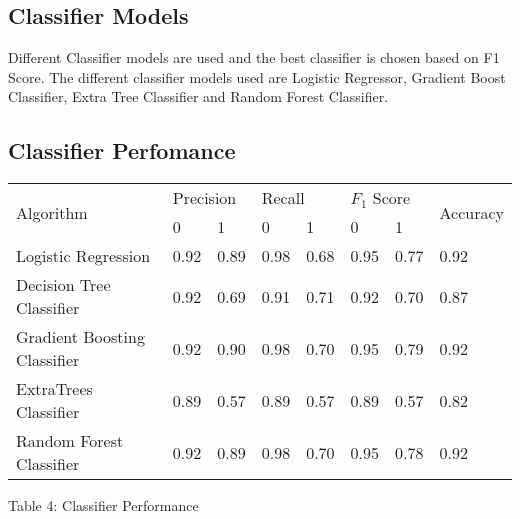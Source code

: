 \documentclass[12pt,letter-paper]{article}
\begin{document}
    \subsection{Classifier Models}
    
        Different Classifier models are used and the best classifier is chosen based on F1 Score. The different classifier models used are Logistic Regressor, Gradient Boost Classifier, Extra Tree Classifier and Random Forest Classifier.
    
    \subsection{Classifier Perfomance}
        \begin{table}[H]
            \begin{center}
                \begin{tabular}{|l|l|l|l|l|l|l|l|}
                    \hline
                    \multirow{2}{*}{Algorithm} & \multicolumn{2}{l|}{Precision} & \multicolumn{2}{l|}{Recall} & \multicolumn{2}{l|}{$F_1$ Score} & \multirow{2}{*}{Accuracy} \\ \cline{2-7}
                                       & 0              & 1             & 0            & 1            & 0             & 1             &                           \\ \hline
                Logistic Regression         & 0.92           & 0.89          & 0.98         & 0.68         & 0.95          & 0.77          & 0.92                      \\ \hline
                Decision Tree Classifier         & 0.92           & 0.69          & 0.91         & 0.71         & 0.92          & 0.70          & 0.87                      \\ \hline
                Gradient Boosting Classifier & 0.92           & 0.90          & 0.98         & 0.70         & 0.95          & 0.79          & 0.92                      \\ \hline
                ExtraTrees Classifier       & 0.89           & 0.57          & 0.89         & 0.57         & 0.89          & 0.57          & 0.82                      \\ \hline
                Random Forest Classifier     & 0.92           & 0.89          & 0.98         & 0.70         & 0.95          & 0.78          & 0.92                      \\ \hline
                \end{tabular}
            \end{center}
            \begin{center}
            Table 4: Classifier Performance
                \end{center}
            \end{table}
    
\end{document}
